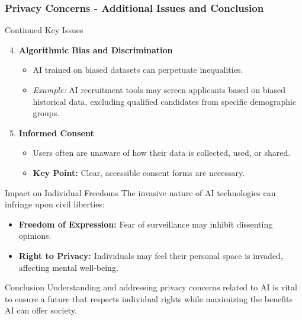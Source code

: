 \documentclass[aspectratio=169]{beamer}
\begin{document}
\begin{frame}[fragile]
    \frametitle{Privacy Concerns - Additional Issues and Conclusion}
    \begin{block}{Continued Key Issues}
        \begin{enumerate}
            \setcounter{enumi}{3}
            \item \textbf{Algorithmic Bias and Discrimination}
            \begin{itemize}
                \item AI trained on biased datasets can perpetuate inequalities.
                \item \textit{Example:} AI recruitment tools may screen applicants based on biased historical data, excluding qualified candidates from specific demographic groups.
            \end{itemize}

            \item \textbf{Informed Consent}
            \begin{itemize}
                \item Users often are unaware of how their data is collected, used, or shared.
                \item \textbf{Key Point:} Clear, accessible consent forms are necessary.
            \end{itemize}
        \end{enumerate}
    \end{block}

    \begin{block}{Impact on Individual Freedoms}
        The invasive nature of AI technologies can infringe upon civil liberties:
        \begin{itemize}
            \item \textbf{Freedom of Expression:} Fear of surveillance may inhibit dissenting opinions.
            \item \textbf{Right to Privacy:} Individuals may feel their personal space is invaded, affecting mental well-being.
        \end{itemize}
    \end{block}
    
    \begin{block}{Conclusion}
        Understanding and addressing privacy concerns related to AI is vital to ensure a future that respects individual rights while maximizing the benefits AI can offer society.
    \end{block}
\end{frame}
\end{document}
